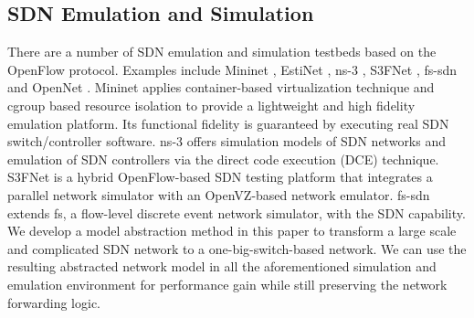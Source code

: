 \subsection{SDN Emulation and Simulation}
There are a number of SDN emulation and simulation testbeds based on the OpenFlow
protocol.
Examples include Mininet \cite{Mininet}, EstiNet \cite{Estinet}, ns-3 \cite{NS3},
S3FNet \cite{S3F_website}, fs-sdn \cite{FSSDN} and OpenNet \cite{OpenNet}.
Mininet  \cite{Mininet} applies container-based virtualization technique and cgroup based resource isolation to provide a lightweight and high fidelity emulation
platform.
Its functional fidelity is guaranteed by executing real SDN switch/controller software.
ns-3 \cite{NS3} offers simulation models of SDN networks and emulation of SDN controllers via the direct code execution (DCE) technique.
S3FNet \cite{S3F_website} is a hybrid OpenFlow-based SDN testing platform that integrates a parallel network simulator with an OpenVZ-based network emulator.
fs-sdn \cite{FSSDN} extends fs, a flow-level discrete event network simulator, with the SDN capability.
We develop a model abstraction method in this paper to transform a large scale and complicated SDN network to a one-big-switch-based network.
We can use the resulting abstracted network model in all the aforementioned simulation and emulation environment for performance gain while still preserving the network forwarding logic.
